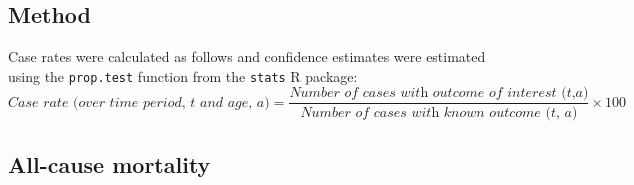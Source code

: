 \documentclass[11pt,twoside]{bristolthesis}
\begin{document}
  \hypertarget{method-2}{%
  \subsection{Method}\label{method-2}}
  
  Case rates were calculated as follows and confidence estimates were estimated using the \texttt{prop.test} function from the \texttt{stats} R package:
  \begin{equation} 
    \textit{Case rate (over time period, t and age, a)} = \frac{\textit{Number of cases with outcome of interest (t,a)}}{\textit{Number of cases with known outcome (t, a)}} \times 100
    \label{eq:CaseRateEq}
  \end{equation}
  \hypertarget{all-cause-mortality}{%
  \subsection{All-cause mortality}\label{all-cause-mortality}}
  
\end{document}
